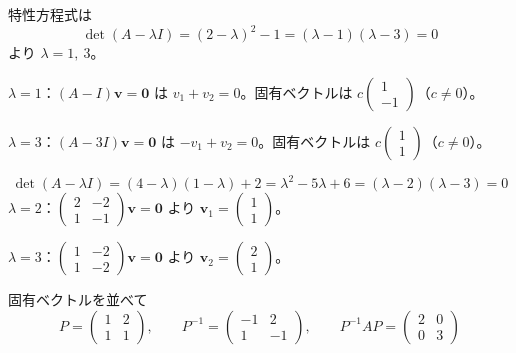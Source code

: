 \documentclass[11pt]{article}
\begin{document}

\problem
\begin{ans}
特性方程式は
\[ \det(A-\lambda I) = (2-\lambda)^2 - 1 = (\lambda-1)(\lambda-3) = 0 \]
より $\lambda = 1,\ 3$。

$\lambda=1$：$(A-I)\boldsymbol v = \boldsymbol 0$ は $v_1 + v_2 = 0$。固有ベクトルは $c\begin{pmatrix}1\\-1\end{pmatrix}$（$c\neq0$）。

$\lambda=3$：$(A-3I)\boldsymbol v = \boldsymbol 0$ は $-v_1 + v_2 = 0$。固有ベクトルは $c\begin{pmatrix}1\\1\end{pmatrix}$（$c\neq0$）。
\end{ans}

\problem
\begin{ans}
\[ \det(A-\lambda I) = (4-\lambda)(1-\lambda) + 2 = \lambda^2 - 5\lambda + 6 = (\lambda-2)(\lambda-3) = 0 \]
$\lambda=2$：$\begin{pmatrix}2&-2\\1&-1\end{pmatrix}\boldsymbol v=\boldsymbol 0$ より $\boldsymbol v_1 = \begin{pmatrix}1\\1\end{pmatrix}$。

$\lambda=3$：$\begin{pmatrix}1&-2\\1&-2\end{pmatrix}\boldsymbol v=\boldsymbol 0$ より $\boldsymbol v_2 = \begin{pmatrix}2\\1\end{pmatrix}$。

固有ベクトルを並べて
\[ P = \begin{pmatrix}1&2\\1&1\end{pmatrix},\qquad P^{-1} = \begin{pmatrix}-1&2\\1&-1\end{pmatrix},\qquad P^{-1}AP = \begin{pmatrix}2&0\\0&3\end{pmatrix} \]
\end{ans}
\end{document}
